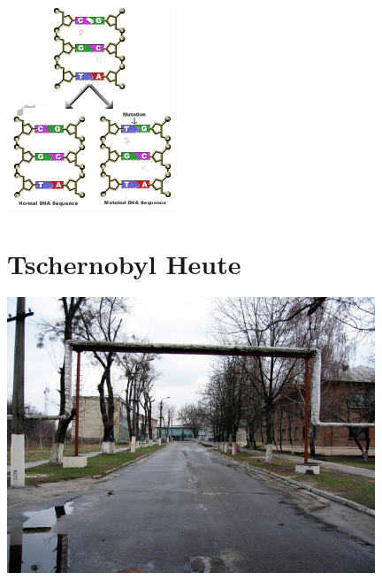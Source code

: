 \documentclass{beamer}
\begin{document}
\begin{frame}{}
    \begin{center}
        \includegraphics[height=6.0cm]{img/Bild_11_Quervernetzung.png}\\
        \begin{block}{}
        \end{block}
    \end{center}
\end{frame}

\section{Tschernobyl Heute}

\begin{frame}[plain]{}
    \begin{center}
        \includegraphics[width=11cm]{img/heute1.jpg}\\
    \end{center}
\end{frame}
\end{document}
